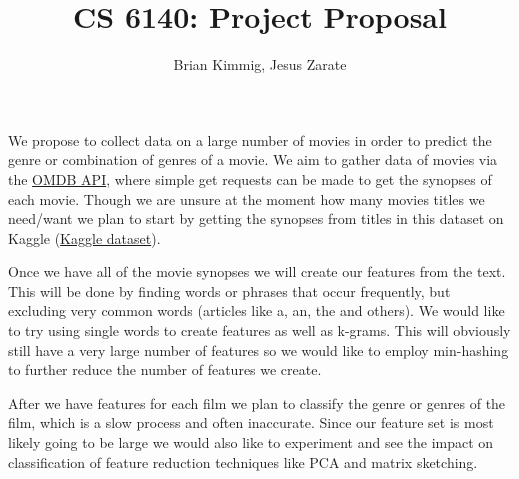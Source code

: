 \documentclass[12pt]{article}
\title{CS 6140: Project Proposal}
\author{Brian Kimmig, Jesus Zarate}
\date{}
\begin{document}
\maketitle
We propose to collect data on a large number of movies in order to predict the genre or combination of genres of a movie. We aim to gather data of movies via the \href{https://www.omdbapi.com/}{OMDB API}, where simple get requests can be made to get the synopses of each movie. Though we are unsure at the moment how many movies titles we need/want we plan to start by getting the synopses from titles in this dataset on Kaggle (\href{https://www.kaggle.com/deepmatrix/imdb-5000-movie-dataset}{Kaggle dataset}). 

Once we have all of the movie synopses we will create our features from the text. This will be done by finding words or phrases that occur frequently, but excluding very common words (articles like a, an, the and others). We would like to try using single words to create features as well as k-grams. This will obviously still have a very large number of features so we would like to employ min-hashing to further reduce the number of features we create. 

After we have features for each film we plan to classify the genre or genres of the film, which is a slow process and often inaccurate. Since our feature set is most likely going to be large we would also like to experiment and see the impact on classification of feature reduction techniques like PCA and matrix sketching.
\end{document}
